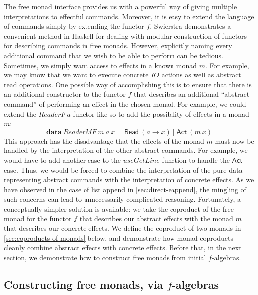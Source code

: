 \documentclass{jfp1}
\newcommand{\kw}[1]{\textbf{#1}}
\begin{document}
The free monad interface provides us with a powerful way of giving
multiple interpretations to effectful commands. Moreover, it is easy
to extend the language of commands simply by extending the functor
$f$. Swierstra \cite{swierstra08data} demonstrates a convenient method
in Haskell for dealing with modular construction of functors for
describing commands in free monads. However, explicitly naming every
additional command that we wish to be able to perform can be
tedious. Sometimes, we simply want access to effects in a known monad
$m$. For example, we may know that we want to execute concrete
$\mathit{IO}$ actions as well as abstract read operations. One
possible way of accomplishing this is to ensure that there is an
additional constructor to the functor $f$ that describes an additional
``abstract command'' of performing an effect in the chosen monad. For
example, we could extend the $\mathit{ReaderF}~a$ functor like so to
add the possibility of effects in a monad $m$:
\begin{displaymath}
  \kw{data}~\mathit{ReaderMF}~m~a~x = \mathsf{Read}~(a \to x) \mathrel| \mathsf{Act}~(m~x)
\end{displaymath}
This approach has the disadvantage that the effects of the monad $m$
must now be handled by the interpretation of the other abstract
commands. For example, we would have to add another case to the
$\mathit{useGetLine}$ function to handle the $\mathsf{Act}$
case. Thus, we would be forced to combine the interpretation of the
pure data representing abstract commands with the interpretation of
concrete effects. As we have observed in the case of list append in
\autoref{sec:direct-eappend}, the mingling of such concerns can lead
to unnecessarily complicated reasoning. Fortunately, a conceptually
simpler solution is available: we take the coproduct of the free monad
for the functor $f$ that describes our abstract effects with the monad
$m$ that describes our concrete effects. We define the coproduct of
two monads in \autoref{sec:coproducts-of-monads} below, and
demonstrate how monad coproducts cleanly combine abstract effects with
concrete effects. Before that, in the next section, we demonstrate how
to construct free monads from initial $f$-algebras.

\subsection{Constructing free monads, via \texorpdfstring{$f$}{f}-algebras}
\label{sec:construct-free-monads}
\end{document}
